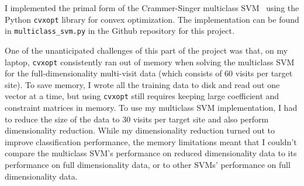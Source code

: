 \documentclass[10pt, twocolumn]{article}
\begin{document}
I implemented the primal form of the Crammer-Singer multiclass SVM~\cite{cramersinger} using the Python \texttt{cvxopt} 
library for convex optimization. The implementation can be found in \texttt{multiclass\_svm.py} in 
the Github repository for this project.

One of the unanticipated challenges of this part of the project was that, on my laptop, \texttt{cvxopt} 
consistently ran out of memory when solving the multiclass SVM for the full-dimensionality multi-visit data
(which consists of 60 visits per target site). To save memory, I wrote all the training data to disk and 
read out one vector at a time, but using \texttt{cvxopt} still requires keeping large coefficient 
and constraint matrices in memory. To use my multiclass SVM implementation, I had to reduce the size of the 
data to 30 visits per target site and also perform dimensionality reduction. While my dimensionality 
reduction turned out to improve classification performance, the memory limitations meant that I couldn't 
compare the multiclass SVM's performance on reduced dimensionality data to its performance on full 
dimensionality data, or to other SVMs' performance on full dimensionality data.
\end{document}
